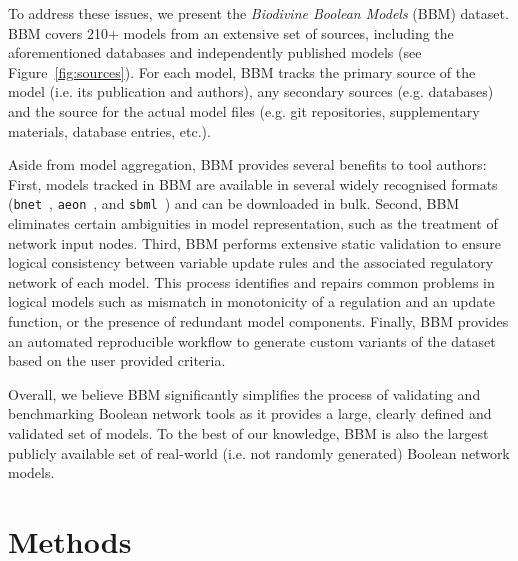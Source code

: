 \documentclass[fleqn,10pt]{wlscirep}
\begin{document}

To address these issues, we present the \emph{Biodivine Boolean Models} (BBM) dataset. BBM covers 210+ models from an extensive set of sources, including the aforementioned databases and independently published models (see Figure~\ref{fig:sources}). For each model, BBM tracks the primary source of the model (i.e. its publication and authors), any secondary sources (e.g. databases) and the source for the actual model files (e.g. git repositories, supplementary materials, database entries, etc.). 

Aside from model aggregation, BBM provides several benefits to tool authors: First, models tracked in BBM are available in several widely recognised formats (\texttt{bnet}~\cite{pyboolnet}, \texttt{aeon}~\cite{aeon}, and \texttt{sbml}~\cite{sbml-qual}) and can be downloaded in bulk. Second, BBM eliminates certain ambiguities in model representation, such as the treatment of network input nodes. Third, BBM performs extensive static validation to ensure logical consistency between variable update rules and the associated regulatory network of each model. This process identifies and repairs common problems in logical models such as mismatch in monotonicity of a regulation and an update function, or the presence of redundant model components. Finally, BBM provides an automated reproducible workflow to generate custom variants of the dataset based on the user provided criteria.

Overall, we believe BBM significantly simplifies the process of validating and benchmarking Boolean network tools as it provides a large, clearly defined and validated set of models. To the best of our knowledge, BBM is also the largest publicly available set of real-world (i.e. not randomly generated) Boolean network models.


\section*{Methods}
\end{document}
